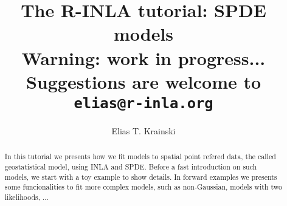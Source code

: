 \documentclass[a4paper,11pt]{report}
\title{\textbf{The R-INLA tutorial: SPDE models}\\
Warning: work in progress...\\
Suggestions are welcome to \texttt{elias@r-inla.org}}
\author{Elias T. Krainski}
\begin{document}
\maketitle

\begin{abstract}
  In this tutorial we presents how we fit models 
  to spatial point refered data, the called 
  geostatistical model, using INLA and SPDE. 
  Before a fast introduction on such models, 
  we start with a toy example to show details. 
  In forward examples we presents some funcionalities 
  to fit more complex models, such as  non-Gaussian,  
  models with two likelihoods, ... 
\end{abstract} 

\tableofcontents











\end{document}
